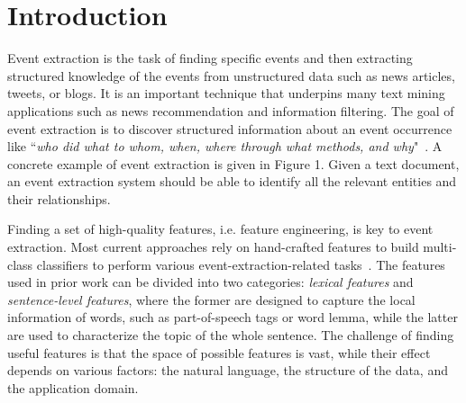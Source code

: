\section{Introduction}

Event extraction is the task of finding specific events and then extracting structured knowledge of the events from
unstructured data such as news articles, tweets, or blogs. It is an important technique that underpins many text mining
applications such as news recommendation and information filtering.
The goal of event extraction is to discover structured information about an event occurrence like ``\emph{who did what to whom,
when, where through what methods, and why}"~\cite{Piskorski2013}. A concrete example of event extraction is
given in Figure 1. Given a text
document, an event extraction system should be able to identify all the relevant entities and their relationships.

Finding a set of high-quality features, i.e. feature engineering, is key to event extraction.
Most current approaches rely on hand-crafted features to build multi-class classifiers to perform various
event-extraction-related tasks~\cite{ahn2006stages,chen2009language,li2012employing,chen2012joint}. The
features used in prior work can be divided into two categories: \emph{lexical features} and \emph{sentence-level features}, where the
former are designed to capture the local information of words, such as part-of-speech tags or word lemma, while the latter are used to
characterize the topic of the whole sentence. The challenge of finding useful
features is that the space of possible features is vast, while their effect depends on various factors: the natural language, the structure of the data, and the application domain.

